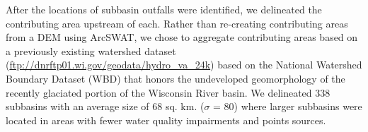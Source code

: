 After the locations of subbasin outfalls were identified, we delineated the contributing area upstream of each.
Rather than re-creating contributing areas from a DEM using ArcSWAT, we chose to aggregate contributing areas based on a previously existing watershed dataset (\href{ftp://dnrftp01.wi.gov/geodata/hydro_va_24k}{ftp://dnrftp01.wi.gov/geodata/hydro\_va\_24k}) based on the National Watershed Boundary Dataset (WBD) that honors the undeveloped geomorphology of the recently glaciated portion of the Wisconsin River basin.
We delineated 338 subbasins with an average size of 68 sq. km. ($\sigma$ = 80) where larger subbasins were located in areas with fewer water quality impairments and points sources.